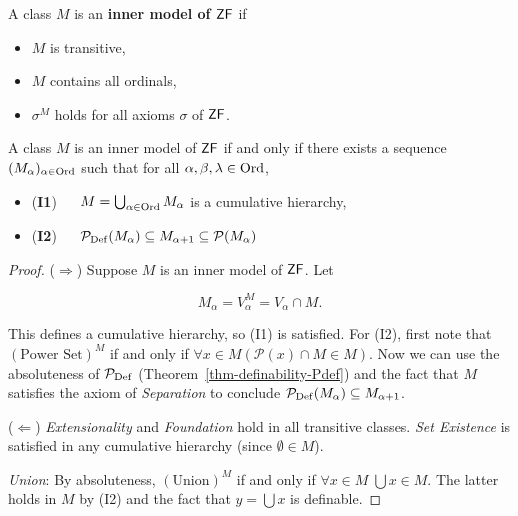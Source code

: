 \begin{definition}\label{def-inner-model}A class $M$ is an \textbf{inner model of $\mathsf{ZF}$} if

\begin{itemize}
\item $M$ is transitive,
\item $M$ contains all ordinals,
\item $\sigma^M$ holds for all axioms $\sigma$ of $\mathsf{ZF}$.
\end{itemize}

\end{definition}\begin{theorem}\label{thm-inner-models}A class $M$ is an inner model of $\mathsf{ZF}$ if and only if there exists a sequence $(M_\alpha)_{\alpha \in \operatorname{Ord}}$ such that for all $\alpha, \beta, \lambda \in \operatorname{Ord}$,

\begin{itemize}
\item (\textbf{I1}) $\quad$ $M = \bigcup_{\alpha \in \operatorname{Ord}} M_\alpha$ is a cumulative hierarchy,
\item (\textbf{I2}) $\quad$ $\mathcal{P}_{\operatorname{Def}}(M_\alpha) \subseteq M_{\alpha+1} \subseteq \mathcal{P}(M_\alpha)$
\end{itemize}

\end{theorem}\begin{proof}($\Rightarrow$) Suppose $M$ is an inner model of $\mathsf{ZF}$. Let

\begin{equation}
M_\alpha = V_\alpha^M = V_\alpha \cap M.
\end{equation}

This defines a cumulative hierarchy, so (I1) is satisfied.
For (I2), first note that $(\text{Power Set})^M$ if and only if $\forall x \in M (\mathcal{P}(x) \cap M \in M)$. Now we can use the absoluteness of $\mathcal{P}_{\operatorname{Def}}$ (Theorem~\ref{thm-definability-Pdef}) and the fact that $M$ satisfies the axiom of \textit{Separation} to conclude $\mathcal{P}_{\operatorname{Def}}(M_\alpha) \subseteq M_{\alpha+1}$.

($\Leftarrow$)
\textit{Extensionality} and \textit{Foundation} hold in all transitive classes. \textit{Set Existence} is satisfied in any cumulative hierarchy (since $\emptyset \in M$).

\textit{Union}: By absoluteness, $(\text{Union})^M$ if and only if $\forall x \in M \; \bigcup x \in M$. The latter holds in $M$ by (I2) and the fact that $y = \bigcup x$ is definable.


\end{proof}
